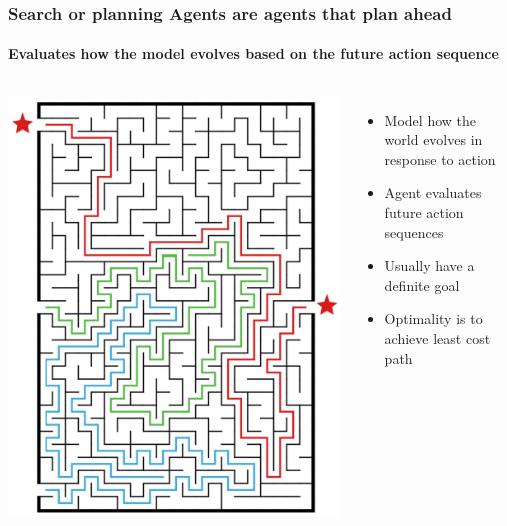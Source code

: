 \documentclass{beamer}
\begin{document}
\begin{frame}
  \frametitle{Search or planning Agents are agents that plan ahead}
  \framesubtitle{Evaluates how the model evolves based on the future action sequence}
  \begin{columns}
    \begin{center}
      \includegraphics[width=\textwidth]{MazeMultiplePathways.jpg}
    \end{center}
      \begin{itemize}
        \item Model how the world evolves in response to action
        \item Agent evaluates future action sequences
        \item Usually have a definite goal
        \item Optimality is to achieve least cost path
      \end{itemize}
  \end{columns}

\end{frame}
\end{document}
